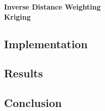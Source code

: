 				\inputminted[mathescape,linenos,numbersep=5pt,frame=lines,framesep=2mm]{python}{./code/nearest_neighbour.py}

			\textbf{Inverse Distance Weighting}\label{datavalidation_inversedistanceweighting} \\

			\textbf{Kriging}\label{datavalidation_kriging} \\
		
	\subsection{Implementation}\label{datavalidation_implementation}
	\subsection{Results}\label{datavalidation_results}
	\subsection{Conclusion}\label{datavalidation_conclusion}
